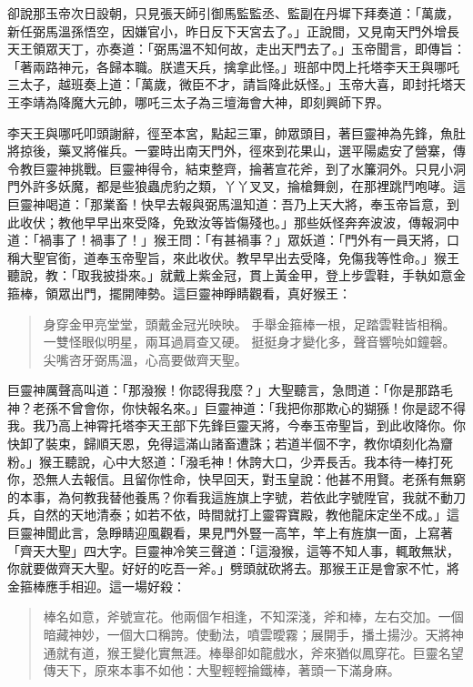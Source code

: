 卻說那玉帝次日設朝，只見張天師引御馬監監丞、監副在丹墀下拜奏道：「萬歲，新任弼馬溫孫悟空，因嫌官小，昨日反下天宮去了。」正說間，又見南天門外增長天王領眾天丁，亦奏道：「弼馬溫不知何故，走出天門去了。」玉帝聞言，即傳旨：「著兩路神元，各歸本職。朕遣天兵，擒拿此怪。」班部中閃上托塔李天王與哪吒三太子，越班奏上道：「萬歲，微臣不才，請旨降此妖怪。」玉帝大喜，即封托塔天王李靖為降魔大元帥，哪吒三太子為三壇海會大神，即刻興師下界。

李天王與哪吒叩頭謝辭，徑至本宮，點起三軍，帥眾頭目，著巨靈神為先鋒，魚肚將掠後，藥叉將催兵。一霎時出南天門外，徑來到花果山，選平陽處安了營寨，傳令教巨靈神挑戰。巨靈神得令，結束整齊，掄著宣花斧，到了水簾洞外。只見小洞門外許多妖魔，都是些狼蟲虎豹之類，丫丫叉叉，掄槍舞劍，在那裡跳鬥咆哮。這巨靈神喝道：「那業畜！快早去報與弼馬溫知道：吾乃上天大將，奉玉帝旨意，到此收伏；教他早早出來受降，免致汝等皆傷殘也。」那些妖怪奔奔波波，傳報洞中道：「禍事了！禍事了！」猴王問：「有甚禍事？」眾妖道：「門外有一員天將，口稱大聖官銜，道奉玉帝聖旨，來此收伏。教早早出去受降，免傷我等性命。」猴王聽說，教：「取我披掛來。」就戴上紫金冠，貫上黃金甲，登上步雲鞋，手執如意金箍棒，領眾出門，擺開陣勢。這巨靈神睜睛觀看，真好猴王：
\begin{quote}
身穿金甲亮堂堂，頭戴金冠光映映。
手舉金箍棒一根，足踏雲鞋皆相稱。
一雙怪眼似明星，兩耳過肩查又硬。
挺挺身才變化多，聲音響喨如鐘磬。
尖嘴咨牙弼馬溫，心高要做齊天聖。
\end{quote}

巨靈神厲聲高叫道：「那潑猴！你認得我麼？」大聖聽言，急問道：「你是那路毛神？老孫不曾會你，你快報名來。」巨靈神道：「我把你那欺心的猢猻！你是認不得我。我乃高上神霄托塔李天王部下先鋒巨靈天將，今奉玉帝聖旨，到此收降你。你快卸了裝束，歸順天恩，免得這滿山諸畜遭誅；若道半個不字，教你頃刻化為齏粉。」猴王聽說，心中大怒道：「潑毛神！休誇大口，少弄長舌。我本待一棒打死你，恐無人去報信。且留你性命，快早回天，對玉皇說：他甚不用賢。老孫有無窮的本事，為何教我替他養馬？你看我這旌旗上字號，若依此字號陞官，我就不動刀兵，自然的天地清泰；如若不依，時間就打上靈霄寶殿，教他龍床定坐不成。」這巨靈神聞此言，急睜睛迎風觀看，果見門外豎一高竿，竿上有旌旗一面，上寫著「齊天大聖」四大字。巨靈神冷笑三聲道：「這潑猴，這等不知人事，輒敢無狀，你就要做齊天大聖。好好的吃吾一斧。」劈頭就砍將去。那猴王正是會家不忙，將金箍棒應手相迎。這一場好殺：
\begin{quote}
棒名如意，斧號宣花。他兩個乍相逢，不知深淺，斧和棒，左右交加。一個暗藏神妙，一個大口稱誇。使動法，噴雲曖霧；展開手，播土揚沙。天將神通就有道，猴王變化實無涯。棒舉卻如龍戲水，斧來猶似鳳穿花。巨靈名望傳天下，原來本事不如他：大聖輕輕掄鐵棒，著頭一下滿身麻。
\end{quote}

